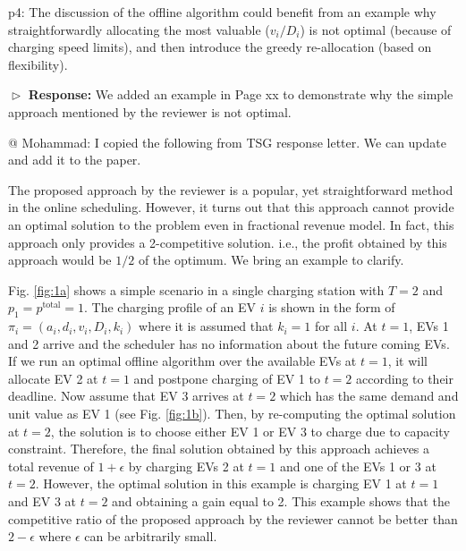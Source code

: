 \documentclass[11pt]{article}
\begin{document}
\vspace{3mm}
{\color{blue} p4: The discussion of the offline algorithm could benefit from an example why straightforwardly allocating the most valuable ($v_i/D_i$) is not optimal (because of charging speed limits), and then introduce the greedy re-allocation (based on flexibility). }
\vspace{3mm}

$\vartriangleright$ \noindent\textbf{Response:} 
We added an example in Page xx to demonstrate why the simple approach mentioned by the reviewer is not optimal.

{\color{red}@ Mohammad: I copied the following from TSG response letter. We can update and add it to the paper.}

The proposed approach by the reviewer is a popular, yet straightforward method in the online scheduling. However, it turns out that this approach cannot provide an optimal solution to the problem even in fractional revenue model. In fact, this approach only provides a 2-competitive solution. i.e., the profit obtained by this approach would be $1/2$ of the optimum. We bring an example to clarify.

Fig. \ref{fig:1a} shows a simple scenario in a single charging station with $T=2$ and $p_1=p^{\text{total}}=1$. The charging profile of an EV $i$ is shown in the form of $\pi_i=(a_i,d_i,v_i,D_i,k_i)$ where it is assumed that $k_i=1$ for all $i$.
At $t=1$, EVs 1 and 2 arrive and the scheduler has no information about the future coming EVs. If we run an optimal offline algorithm over the available EVs at $t=1$, it will allocate EV 2 at $t=1$ and postpone charging of EV 1 to $t=2$ according to their deadline. Now assume that EV 3 arrives at $t=2$ which has the same demand and unit value as EV 1 (see Fig. \ref{fig:1b}). Then, by re-computing the optimal solution at $t=2$, the solution is to choose either EV 1 or EV 3 to charge due to capacity constraint. Therefore, the final solution obtained by this approach achieves a total revenue of $1+\epsilon$ by charging EVs 2 at $t=1$ and one of the EVs 1 or 3 at $t=2$. However, the optimal solution in this example is charging EV 1 at $t=1$ and EV 3 at $t=2$ and obtaining a gain equal to 2. This example shows that the competitive ratio of the proposed approach by the reviewer cannot be better than $2-\epsilon$ where $\epsilon$ can be arbitrarily small.  
\end{document}
